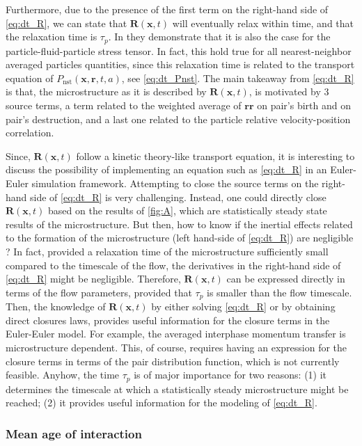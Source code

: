 Furthermore, due to the presence of the first term on the right-hand side of \ref{eq:dt_R}, we can state that $\textbf{R}(\textbf{x},t)$ will eventually relax within time, and that the relaxation time is $\tau_p$. 
In \citet{zhang2023evolution} they demonstrate that it is also the case for the particle-fluid-particle stress tensor.
In fact, this hold true for all nearest-neighbor averaged particles quantities, since this relaxation time is related to the transport equation of $P_\text{nst}(\textbf{x},\textbf{r},t,a)$, see \ref{eq:dt_Pnst}.
The main takeaway from \ref{eq:dt_R} is that, the microstructure as it is described by $\textbf{R}(\textbf{x},t)$, is motivated by 3 source terms, a term related to the weighted average of $\textbf{rr}$ on pair's birth and on pair's destruction, and a last one related to the particle relative velocity-position correlation. 


Since, $\textbf{R}(\textbf{x},t)$ follow a kinetic theory-like transport equation, it is interesting to discuss the possibility of implementing an equation such as \ref{eq:dt_R} in an Euler-Euler simulation framework. 
Attempting to close the source terms on the right-hand side of \ref{eq:dt_R} is very challenging. 
Instead, one could directly close $\textbf{R}(\textbf{x},t)$ based on the results of \ref{fig:A}, which are statistically steady state results of the microstructure. 
But then, how to know if the inertial effects related to the formation of the microstructure  (left hand-side of \ref{eq:dt_R}) are negligible ?
In fact, provided a relaxation time of the microstructure sufficiently small compared to the timescale of the flow, the derivatives in the right-hand side of \ref{eq:dt_R} might be negligible.
Therefore, $\textbf{R}(\textbf{x},t)$ can be expressed directly in terms of the flow parameters, provided that $\tau_p$ is smaller than the flow timescale. 
Then, the knowledge of $\textbf{R}(\textbf{x},t)$ by either solving \ref{eq:dt_R} or by obtaining direct closures laws, provides useful information for the closure terms in the Euler-Euler model.
For example, the averaged interphase momentum transfer is microstructure dependent. 
This, of course, requires having an expression for the closure terms in terms of the pair distribution function, which is not currently feasible.
Anyhow, the time $\tau_p$ is of major importance for two reasons: 
(1) it determines the timescale at which a statistically steady microstructure might be reached; 
(2) it provides useful information for the modeling of \ref{eq:dt_R}.

\subsubsection*{Mean age of interaction}

